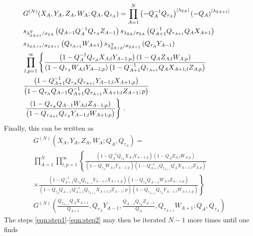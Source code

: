 \documentclass[main.tex]{subfiles}
\begin{document}
\begin{equation}\label{eqn:step2}
\begin{aligned}
&G^{(N)}(X_A,Y_A,Z_A,W_A;Q_A,Q_{\tau_A})=\prod_{A=1}^N\left(-Q^{-1}_{A}Q_{\tau_{A}}\right)^{|\lambda_{2A}|}\left(-Q_{A}\right)^{|\lambda_{2A+1}|}\\
& s_{\lambda_{2A+1}^{\operatorname{T}}/\sigma_{2A}}\left(Q_{A-1}Q^{-1}_{A}Q_{\tau_{A}}Z_{A-1}\right)s_{\lambda_{2A}/\sigma_{2A}}\left(Q^{-1}_{A+1}Q_{\tau_{A+1}}Q_{A}X_{A+1}\right)\\
&s_{\lambda_{2A+1}/\sigma_{2A+1}}\left(Q_{\tau_{A+1}}W_{A+1}\right)s_{\lambda_{2A+2}^{\operatorname{T}}/\sigma_{2A+1}}\left(Q_{\tau_{A}}Y_{A-1}\right)\\
&\prod_{l,p=1}^{\infty}\left\{\frac{\left(1-Q^{-1}_{A}Q_{\tau_{A}}X_{A;l}Y_{A-1;p}\right)\left(1-Q_{A}Z_{A;l}W_{A;p}\right)}{\left(1-Q_{\tau_{A}}W_{A;l}Y_{A-1;p}\right)\left(1-Q^{-1}_{A+1}Q_{\tau_{A+1}}Q_{A}X_{A+1;l}Z_{A;p}\right)}\right.\\
&\frac{\left(1-Q^{-1}_{A+1}Q_{\tau_{A}}Q_{\tau_{A+1}}Y_{A-1;l}X_{A+1;p}\right)}{\left(1-Q_{\tau_{A}}Q_{A-1}Q^{-1}_{A+1}Q_{\tau_{A+1}}X_{A+1;l}Z_{A-1};p\right)}\\
&\left.\frac{\left(1-Q_{\tau_{A}}Q_{A-1}W_{A;l}Z_{A-1;p}\right)}{\left(1-Q_{\tau_{A+1}}Q_{\tau_{A}}Y_{A-1;l}W_{A+1;p}\right)}\right\}\,.
\end{aligned}
\end{equation}
Finally, this can be written as
\begin{equation}
\begin{aligned}
&G^{(N)}(X_A,Y_A,Z_A,W_A;Q_A,Q_{\tau_A})=\\
&\prod_{A=1}^N\prod_{l,p=1}^{\infty}\left\{\frac{\left(1-Q^{-1}_{A}Q_{\tau_{A}}X_{A;l}Y_{A-1;p}\right)\left(1-Q_{A}Z_{A;l}W_{A;p}\right)}{\left(1-Q_{\tau_{A}}W_{A;l}Y_{A-1;p}\right)\left(1-Q^{-1}_{A+1}Q_{\tau_{A+1}}Q_{A}X_{A+1;l}Z_{A;p}\right)}\right.\\
&\left. \times\frac{\left(1-Q^{-1}_{A+1}Q_{\tau_{A}}Q_{\tau_{A+1}}Y_{A-1;l}X_{A+1;p}\right)\left(1-Q_{\tau_{A}}Q_{A-1}W_{A;l}Z_{A-1;p}\right)}{\left(1-Q_{\tau_{A}}Q_{A-1}Q^{-1}_{A+1}Q_{\tau_{A+1}}X_{A+1;l}Z_{A-1};p\right)\left(1-Q_{\tau_{A+1}}Q_{\tau_{A}}Y_{A-1;l}W_{A+1;p}\right)}\right\}\\
&G^{(N)}\left(\frac{Q_{\tau_{A+1}}Q_{A}X_{A+1}}{Q_{A+1}},Q_{\tau_{A}}Y_{A-1},\frac{Q_{A-1}Q_{\tau_{A}}Z_{A-1}}{Q_A},Q_{\tau_{A+1}}W_{A+1};Q_A,Q_{\tau_A}\right)
\end{aligned}
\end{equation}
The steps \eqref{eqn:step1}-\eqref{eqn:step2} may then be iterated $N-1$ more times until one finds 
\end{document}
